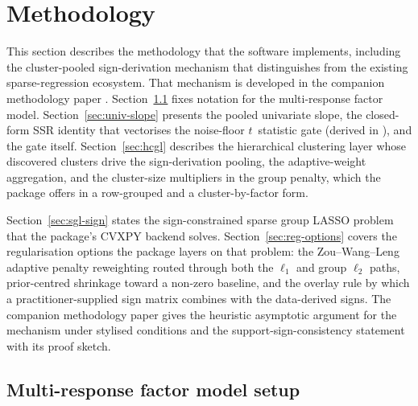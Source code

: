 \documentclass[article]{jss}
\begin{document}

\section{Methodology} \label{sec:methods}

This section describes the methodology that the software implements,
including the cluster-pooled sign-derivation mechanism that distinguishes
 from the existing sparse-regression ecosystem. That
mechanism is developed in the companion methodology paper
\citep{Sepp+Kastenholz:2026sign}. Section~\ref{sec:setup} fixes notation for the multi-response
factor model. Section~\ref{sec:univ-slope} presents the pooled
univariate slope, the closed-form SSR identity that vectorises the
noise-floor $t$~statistic gate (derived in
\citet{Sepp+Kastenholz:2026sign}), and the gate itself. Section~\ref{sec:hcgl} describes the hierarchical clustering layer whose discovered
clusters drive the sign-derivation pooling, the adaptive-weight aggregation,
and the cluster-size multipliers in the group penalty, which the package
offers in a row-grouped and a cluster-by-factor form.

Section~\ref{sec:sgl-sign} states the sign-constrained sparse group
LASSO problem that the package's CVXPY backend solves.
Section~\ref{sec:reg-options} covers the regularisation options the
package layers on that problem: the Zou--Wang--Leng adaptive penalty
reweighting routed through both the $\ell_1$ and group $\ell_2$ paths,
prior-centred shrinkage toward a non-zero baseline, and the overlay rule
by which a practitioner-supplied sign matrix combines with the
data-derived signs. The companion methodology paper \citep{Sepp+Kastenholz:2026sign} gives the
heuristic asymptotic argument for the mechanism under stylised conditions
and the support-sign-consistency statement with its proof sketch.


\subsection[Multi-response factor model setup]{Multi-response factor model setup} \label{sec:setup}
\end{document}
